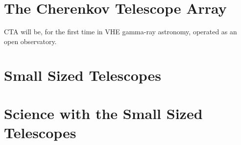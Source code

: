 \section{The Cherenkov Telescope Array}

CTA will be, for the first time in VHE gamma-ray astronomy, operated as an open observatory.

\section{Small Sized Telescopes}

\section{Science with the Small Sized Telescopes}

